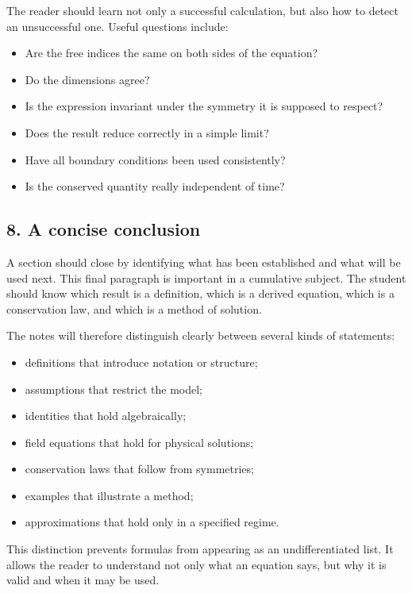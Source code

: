 The reader should learn not only a successful calculation, but also how to detect an unsuccessful one. Useful questions include:

\begin{itemize}
    \item Are the free indices the same on both sides of the equation?
    \item Do the dimensions agree?
    \item Is the expression invariant under the symmetry it is supposed to respect?
    \item Does the result reduce correctly in a simple limit?
    \item Have all boundary conditions been used consistently?
    \item Is the conserved quantity really independent of time?
\end{itemize}

\subsection*{8. A concise conclusion}

A section should close by identifying what has been established and what will be used next. This final paragraph is important in a cumulative subject. The student should know which result is a definition, which is a derived equation, which is a conservation law, and which is a method of solution.

The notes will therefore distinguish clearly between several kinds of statements:

\begin{itemize}
    \item definitions that introduce notation or structure;
    \item assumptions that restrict the model;
    \item identities that hold algebraically;
    \item field equations that hold for physical solutions;
    \item conservation laws that follow from symmetries;
    \item examples that illustrate a method;
    \item approximations that hold only in a specified regime.
\end{itemize}

This distinction prevents formulas from appearing as an undifferentiated list. It allows the reader to understand not only what an equation says, but why it is valid and when it may be used.
